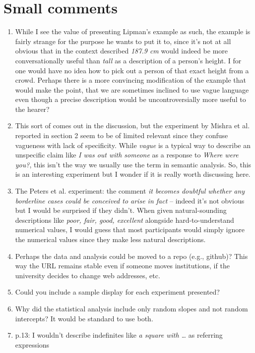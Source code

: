 \documentclass{tufte-handout}
\begin{document}
\section*{Small comments}
\begin{enumerate}
\item
While I see the value of presenting Lipman's example as such, the example is fairly strange for the purpose he wants to put it to, since it's not at all obvious that in the context described \emph{187.9 cm} would indeed be more conversationally useful than \emph{tall} as a description of a person's height. I for one would have no idea how to pick out a person of that exact height from a crowd. Perhaps there is a more convincing modification of the example that would make the point, that we are sometimes inclined to use vague language even though a precise description would be uncontroversially more useful to the hearer?
\item
This sort of comes out in the discussion, but the experiment by Mishra et al. reported in section 2 seem to be of limited relevant since they confuse vagueness with lack of specificity. While \emph{vague} is a typical way to describe an unspecific claim like \emph{I was out with someone} as a response to \emph{Where were you?}, this isn't the way we usually use the term in semantic analysis. So, this is an interesting experiment but I wonder if it is really worth discussing here.
\item
The Peters et al. experiment: the comment \emph{it becomes doubtful whether any borderline cases could be conceived to arise in fact} -- indeed it's not obvious but I would be surprised if they didn't. When given natural-sounding descriptions like \emph{poor, fair, good, excellent} alongside hard-to-understand numerical values, I would guess that most participants would simply ignore the numerical values since they make less natural descriptions.
\item
Perhaps the data and analysis could be moved to a repo (e.g., github)? This way the URL remains stable even if someone moves institutions, if the university decides to change web addresses, etc. 
\item
Could you include a sample display for each experiment presented?
\item
Why did the statistical analysis include only random slopes and not random intercepts? It would be standard to use both.
\item
p.13: I wouldn't describe indefinites like \emph{a square with \ldots} as referring expressions

\end{enumerate}
\end{document}
